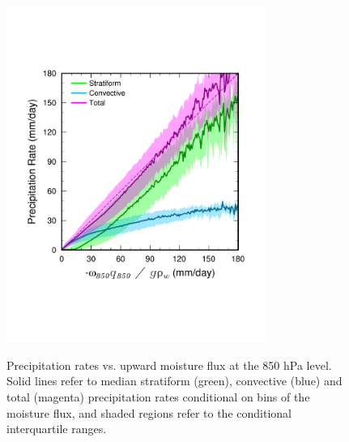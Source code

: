 \documentclass[alpha-refs]{wiley-article}
\begin{document}
\begin{figure}
\begin{center}
\noindent\includegraphics[width=20pc,angle=0]{figs/temp_mflux.pdf}\\
\end{center}
\caption{Precipitation rates vs. upward moisture flux at the 850 hPa level. Solid lines refer to median stratiform (green), convective (blue) and total (magenta) precipitation rates conditional on bins of the moisture flux, and shaded regions refer to the conditional interquartile ranges.}
\label{fig:mflux}
\end{figure}
\end{document}
